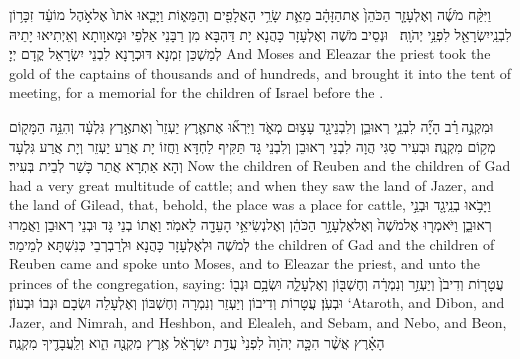 {וַיִּקַּ֨ח מֹשֶׁ֜ה וְאֶלְעָזָ֤ר הַכֹּהֵן֙ אֶת\maqqaf הַזָּהָ֔ב מֵאֵ֛ת שָׂרֵ֥י הָאֲלָפִ֖ים וְהַמֵּא֑וֹת וַיָּבִ֤אוּ אֹתוֹ֙ אֶל\maqqaf אֹ֣הֶל מוֹעֵ֔ד זִכָּר֥וֹן לִבְנֵֽי\maqqaf יִשְׂרָאֵ֖ל לִפְנֵ֥י יְהֹוָֽה׃ \petucha }
{וּנְסֵיב מֹשֶׁה וְאֶלְעָזָר כָּהֲנָא יָת דַּהְבָּא מִן רַבָּנֵי אַלְפֵי וּמָאוָותָא וְאֵיְתִיאוּ יָתֵיהּ לְמַשְׁכַּן זִמְנָא דּוּכְרָנָא לִבְנֵי יִשְׂרָאֵל קֳדָם יְיָ׃}
{And Moses and Eleazar the priest took the gold of the captains of thousands and of hundreds, and brought it into the tent of meeting, for a memorial for the children of Israel before the \lord.}{}

\newperek
{}
{וּמִקְנֶ֣ה \legarmeh  רַ֗ב הָיָ֞ה לִבְנֵ֧י רְאוּבֵ֛ן וְלִבְנֵי\maqqaf גָ֖ד עָצ֣וּם מְאֹ֑ד וַיִּרְא֞וּ אֶת\maqqaf אֶ֤רֶץ יַעְזֵר֙ וְאֶת\maqqaf אֶ֣רֶץ גִּלְעָ֔ד וְהִנֵּ֥ה הַמָּק֖וֹם מְק֥וֹם מִקְנֶֽה׃}
{וּבְעִיר סַגִּי הֲוָה לִבְנֵי רְאוּבֵן וְלִבְנֵי גָּד תַּקִּיף לַחְדָּא וַחֲזוֹ יָת אֲרַע יַעְזֵר וְיָת אֲרַע גִּלְעָד וְהָא אַתְרָא אֲתַר כָּשַׁר לְבֵית בְּעִיר׃}
{Now the children of Reuben and the children of Gad had a very great multitude of cattle; and when they saw the land of Jazer, and the land of Gilead, that, behold, the place was a place for cattle,}{}
{וַיָּבֹ֥אוּ בְנֵֽי\maqqaf גָ֖ד וּבְנֵ֣י רְאוּבֵ֑ן וַיֹּאמְר֤וּ אֶל\maqqaf מֹשֶׁה֙ וְאֶל\maqqaf אֶלְעָזָ֣ר הַכֹּהֵ֔ן וְאֶל\maqqaf נְשִׂיאֵ֥י הָעֵדָ֖ה לֵאמֹֽר׃}
{וַאֲתוֹ בְנֵי גָּד וּבְנֵי רְאוּבֵן וַאֲמַרוּ לְמֹשֶׁה וּלְאֶלְעָזָר כָּהֲנָא וּלְרַבְרְבֵי כְּנִשְׁתָּא לְמֵימַר׃}
{the children of Gad and the children of Reuben came and spoke unto Moses, and to Eleazar the priest, and unto the princes of the congregation, saying:}{}
{עֲטָר֤וֹת וְדִיבֹן֙ וְיַעְזֵ֣ר וְנִמְרָ֔ה וְחֶשְׁבּ֖וֹן וְאֶלְעָלֵ֑ה וּשְׂבָ֥ם וּנְב֖וֹ וּבְעֹֽן׃}
{עֲטָרוֹת וְדִיבוֹן וְיַעְזֵר וְנִמְרָה וְחֶשְׁבּוֹן וְאֶלְעָלֵה וּשְׂבָם וּנְבוֹ וּבְעוֹן׃}
{‘Ataroth, and Dibon, and Jazer, and Nimrah, and Heshbon, and Elealeh, and Sebam, and Nebo, and Beon,}{}
{הָאָ֗רֶץ אֲשֶׁ֨ר הִכָּ֤ה יְהֹוָה֙ לִפְנֵי֙ עֲדַ֣ת יִשְׂרָאֵ֔ל אֶ֥רֶץ מִקְנֶ֖ה הִ֑וא וְלַֽעֲבָדֶ֖יךָ מִקְנֶֽה׃ \setuma }
